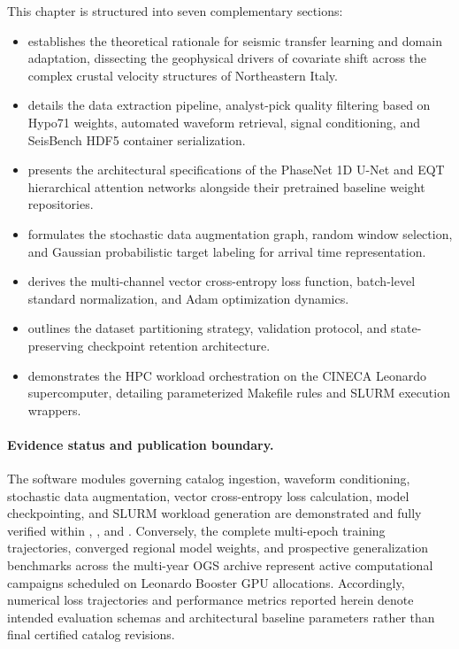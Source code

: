 This chapter is structured into seven complementary sections:
\begin{itemize}
  \item {} establishes the
    theoretical rationale for seismic transfer learning and domain
    adaptation, dissecting the geophysical drivers of covariate shift
    across the complex crustal velocity structures of Northeastern Italy.
  \item {} details the data
    extraction pipeline, analyst-pick quality filtering based on Hypo71
    weights, automated waveform retrieval, signal conditioning, and
    SeisBench HDF5 container serialization.
  \item {} presents the architectural
    specifications of the \ac{PhaseNet} 1D U-Net and \ac{EQT}
    hierarchical attention networks alongside their pretrained baseline
    weight repositories.
  \item {} formulates the stochastic data
    augmentation graph, random window selection, and Gaussian probabilistic
    target labeling for arrival time representation.
  \item {} derives the multi-channel
    vector cross-entropy loss function, batch-level standard normalization,
    and Adam optimization dynamics.
  \item {} outlines the
    dataset partitioning strategy, validation protocol, and state-preserving
    checkpoint retention architecture.
  \item {} demonstrates the \ac{HPC} workload
    orchestration on the \ac{CINECA} Leonardo supercomputer, detailing
    parameterized Makefile rules and SLURM execution wrappers.
\end{itemize}

\paragraph{Evidence status and publication boundary.}
The software modules governing catalog ingestion, waveform conditioning,
stochastic data augmentation, vector cross-entropy loss calculation,
model checkpointing, and SLURM workload generation are demonstrated and
fully verified within ,
, and .
Conversely, the complete multi-epoch training trajectories, converged regional
model weights, and prospective generalization benchmarks across the multi-year
\ac{OGS} archive represent active computational campaigns scheduled on Leonardo
Booster \ac{GPU} allocations.
Accordingly, numerical loss trajectories and performance metrics reported
herein denote intended evaluation schemas and architectural baseline
parameters rather than final certified catalog revisions.

